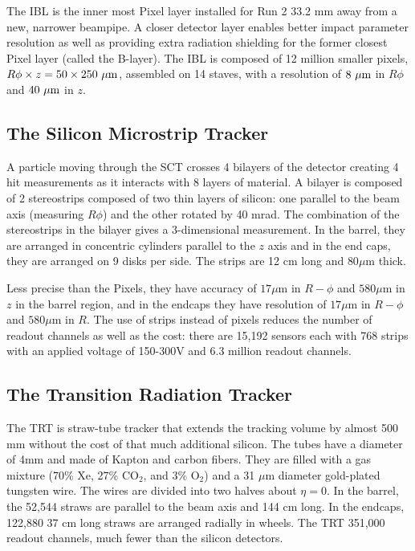 The \ac{IBL} is the inner most Pixel layer installed for Run 2 33.2 mm away from a new, narrower beampipe. A closer detector layer enables better impact parameter resolution as well as providing extra radiation shielding for the former closest Pixel layer (called the B-layer). The \ac{IBL} is composed of 12 million smaller pixels, $R\phi \times z = 50 \times 250~\mu\text{m}$, assembled on 14 staves, with a resolution of $8~\mu\text{m}$ in $R\phi$ and $40~\mu\text{m}$ in $z$.



\subsection{The Silicon Microstrip Tracker}
A particle moving through the \ac{SCT} crosses 4 bilayers of the detector creating 4 hit measurements as it interacts with 8 layers of material. A  bilayer is composed of 2 stereostrips composed of two thin layers of silicon: one parallel to the beam axis (measuring $R\phi$) and the other rotated by 40 mrad. The combination of the stereostrips in the bilayer gives a 3-dimensional measurement. In the barrel, they are arranged in concentric cylinders parallel to the $z$ axis and in the end caps, they are arranged on 9 disks per side. The strips are 12 cm long and $80 \mu\textrm{m}$ thick.

Less precise than the Pixels, they have accuracy of $17 \mu \textrm{m}$ in $R-\phi$ and $580 \mu \textrm{m}$ in $z$ in the barrel region, and in the endcaps they have resolution of $17 \mu \textrm{m}$ in $R-\phi$ and $580 \mu \textrm{m}$ in $R$. The use of strips instead of pixels reduces the number of readout channels as well as the cost: there are 15,192 sensors each with 768 strips with an applied voltage of 150-300V and 6.3 million readout channels.
 

\subsection{The Transition Radiation Tracker}
The \ac{TRT} is straw-tube tracker that extends the tracking volume by almost 500 mm without the cost of that much additional silicon. The tubes have a diameter of 4mm and made of Kapton and carbon fibers. They are filled with a gas mixture (70\% Xe, 27\% CO$_{2}$, and 3\% O$_{2}$) and a 31 $\mu$m diameter gold-plated tungsten wire. The wires are divided into two halves about $\eta = 0$. In the barrel, the 52,544 straws are parallel to the beam axis and 144 cm long. In the endcaps, 122,880 37 cm long straws are arranged radially in wheels. The \ac{TRT} 351,000 readout channels, much fewer than the silicon detectors.


